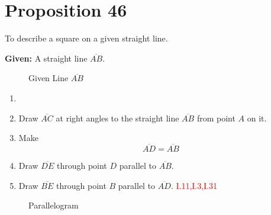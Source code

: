 
\section*{Proposition 46}

\renewcommand\qedsymbol{Q.E.F}

\begin{con}
To describe a square on a given straight line.
\end{con}

\textbf{Given:} A straight line $\overline{AB}$.

\begin{figure}[H]
	\caption{Given Line $\overline{AB}$}
\end{figure}

\begin{con}

\begin{enumerate}
\item[]
    \item Draw $\overline{AC}$ at right angles to the straight line $\overline{AB}$ from point $A$ on it.
    \item Make \[\overline{AD} = \overline{AB}\]
    \item Draw $\overline{DE}$ through point $D$ parallel to $\overline{AB}$.
    \item Draw $\overline{BE}$ through point $B$ parallel to $\overline{AD}$. \hfill\textcolor{red}{I.11,I.3,I.31}
\end{enumerate}

\end{con}

\begin{figure}[H]
	\caption{Parallelogram}
\end{figure}

